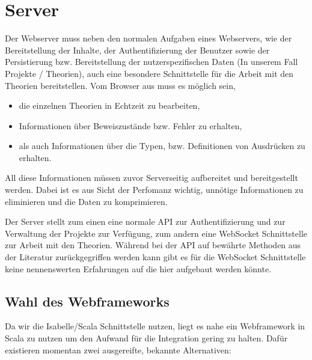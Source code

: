\section{Server}

Der Webserver muss neben den normalen Aufgaben eines Webservers, wie der Bereitstellung der Inhalte,
der Authentifizierung der Benutzer sowie der Persistierung bzw. Bereitstellung der
nutzerspezifischen Daten (In unserem Fall Projekte / Theorien), auch eine besondere Schnittstelle
für die Arbeit mit den Theorien bereitstellen. Vom Browser aus muss es möglich sein,

\begin{itemize}
  \item die einzelnen Theorien in Echtzeit zu bearbeiten,
  \item Informationen über Beweiszustände bzw. Fehler zu erhalten,
  \item als auch Informationen über die Typen, bzw. Definitionen von Ausdrücken zu erhalten.
\end{itemize}

All diese Informationen müssen zuvor Serverseitig aufbereitet und bereitgestellt werden. Dabei ist
es aus Sicht der Perfomanz wichtig, unnötige Informationen zu eliminieren und die Daten zu
komprimieren.

Der Server stellt zum einen eine normale  API zur Authentifizierung und zur Verwaltung der
Projekte zur Verfügung, zum andern eine WebSocket Schnittstelle zur Arbeit mit den Theorien. Während
bei der  API auf bewährte Methoden aus der Literatur zurückgegriffen werden kann gibt es
für die WebSocket Schnittstelle keine nennenswerten Erfahrungen auf die hier aufgebaut werden
könnte.

\subsection{Wahl des Webframeworks}

Da wir die Isabelle/Scala Schnittstelle nutzen, liegt es nahe ein Webframework in Scala zu nutzen um
den Aufwand für die Integration gering zu halten. Dafür existieren momentan zwei ausgereifte,
bekannte Alternativen:

